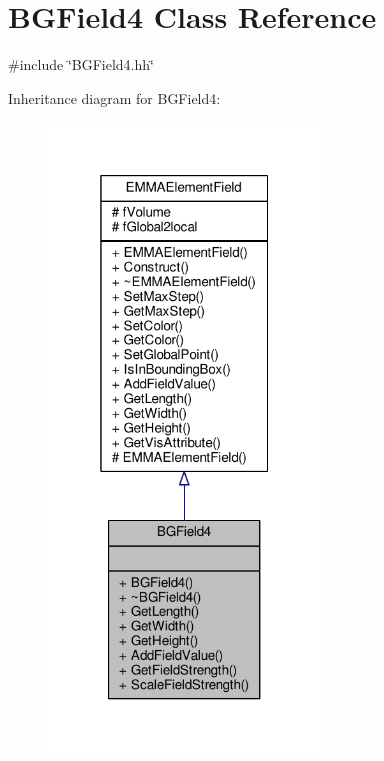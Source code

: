 \hypertarget{classBGField4}{}\section{B\+G\+Field4 Class Reference}
\label{classBGField4}


{\ttfamily \#include \char`\"{}B\+G\+Field4.\+hh\char`\"{}}



Inheritance diagram for B\+G\+Field4\+:
\nopagebreak
\begin{figure}[H]
\begin{center}
\leavevmode
\includegraphics[width=205pt]{classBGField4__inherit__graph}
\end{center}
\end{figure}


